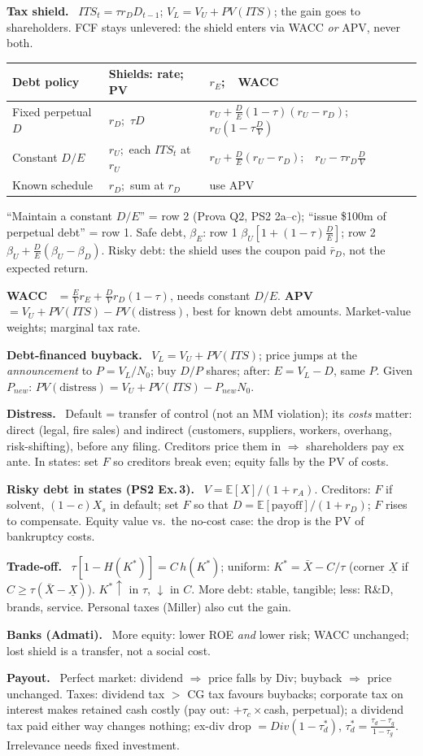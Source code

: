 \documentclass[8pt,a4paper]{extarticle}
\newcommand{\sect}[1]{\par\needspace{4\baselineskip}\smallskip{\color{hd}\large\bfseries #1}\par\nopagebreak\vspace{1pt}}
\newcommand{\hd}[1]{\par\textbf{\color{hd}#1}~}
\newcommand{\E}{\mathbb{E}}
\begin{document}
\begin{multicols}{2}
\sect{3. Topic 2B --- Taxes, distress, trade-off, payout}
\hd{Tax shield.} $ITS_t=\tau r_DD_{t-1}$; $V_L=V_U+PV(ITS)$; the gain goes to shareholders. FCF stays
unlevered: the shield enters via WACC \emph{or} APV, never both.
\begin{center}\footnotesize
\begin{tabularx}{\columnwidth}{@{}>{\raggedright\arraybackslash}p{2.1cm}>{\raggedright\arraybackslash}p{2.0cm}Y@{}}
\toprule
Debt policy & Shields: rate; PV & $r_E$;\ \ WACC \\ \midrule
Fixed perpetual $D$ & $r_D$;\ $\tau D$ & $r_U+\frac DE(1-\tau)(r_U-r_D)$;\ \ $r_U(1-\tau\frac DV)$ \\[2pt]
Constant $D/E$ & $r_U$;\ each $ITS_t$ at $r_U$ & $r_U+\frac DE(r_U-r_D)$;\ \ $r_U-\tau r_D\frac DV$ \\[2pt]
Known schedule & $r_D$;\ sum at $r_D$ & use APV \\ \bottomrule
\end{tabularx}
\end{center}
``Maintain a constant $D/E$'' = row 2 (Prova Q2, PS2 2a--c); ``issue \$100m of perpetual debt'' = row 1.
Safe debt, $\beta_E$: row 1 $\beta_U[1+(1-\tau)\frac DE]$; row 2 $\beta_U+\frac DE(\beta_U-\beta_D)$.
Risky debt: the shield uses the coupon paid $\bar r_D$, not the expected return.
\hd{WACC} $=\frac EVr_E+\frac DVr_D(1-\tau)$, needs constant $D/E$. \textbf{APV} $=V_U+PV(ITS)-
PV(\text{distress})$, best for known debt amounts. Market-value weights; marginal tax rate.
\hd{Debt-financed buyback.} $V_L=V_U+PV(ITS)$; price jumps at the \emph{announcement} to
$P=V_L/N_0$; buy $D/P$ shares; after: $E=V_L-D$, same $P$. Given $P_{new}$:
$PV(\text{distress})=V_U+PV(ITS)-P_{new}N_0$.
\hd{Distress.} Default = transfer of control (not an MM violation); its \emph{costs} matter: direct
(legal, fire sales) and indirect (customers, suppliers, workers, overhang, risk-shifting), before any
filing. Creditors price them in $\Rightarrow$ shareholders pay ex ante. In states: set $F$ so creditors
break even; equity falls by the PV of costs.
\hd{Risky debt in states (PS2 Ex.\,3).} $V=\E[X]/(1+r_A)$. Creditors: $F$ if solvent, $(1-c)X_s$ in
default; set $F$ so that $D=\E[\text{payoff}]/(1+r_D)$; $F$ rises to compensate. Equity value vs.\ the
no-cost case: the drop is the PV of bankruptcy costs.
\hd{Trade-off.} $\tau[1-H(K^*)]=C\,h(K^*)$; uniform: $K^*=\bar X-C/\tau$ (corner $\underline X$ if
$C\ge\tau(\bar X-\underline X)$). $K^*\uparrow$ in $\tau$, $\downarrow$ in $C$. More debt: stable,
tangible; less: R\&D, brands, service. Personal taxes (Miller) also cut the gain.
\hd{Banks (Admati).} More equity: lower ROE \emph{and} lower risk; WACC unchanged; lost shield is a
transfer, not a social cost.
\hd{Payout.} Perfect market: dividend $\Rightarrow$ price falls by Div; buyback $\Rightarrow$ price
unchanged. Taxes: dividend tax $>$ CG tax favours buybacks; corporate tax on interest makes retained
cash costly (pay out: $+\tau_c\times$cash, perpetual); a dividend tax paid either way changes nothing;
ex-div drop $=Div(1-\tau_d^*)$, $\tau_d^*=\frac{\tau_d-\tau_g}{1-\tau_g}$. Irrelevance needs fixed
investment.


\end{multicols}
\end{document}
